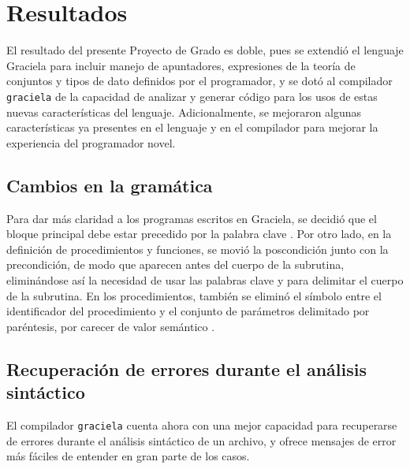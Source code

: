 \chapter{Resultados}
\label{capitulo4}

El resultado del presente Proyecto de Grado es doble, pues se extendió el
lenguaje Graciela para incluir manejo de apuntadores, expresiones de la teoría
de conjuntos y tipos de dato definidos por el programador, y se dotó al
compilador \texttt{graciela} de la capacidad de analizar y generar código para
los usos de estas nuevas características del lenguaje. Adicionalmente, se
mejoraron algunas características ya presentes en el lenguaje y en el compilador
para mejorar la experiencia del programador novel.


\section{Cambios en la gramática}

Para dar más claridad a los programas escritos en Graciela, se decidió que el
bloque principal debe estar precedido por la palabra clave .  Por
otro lado, en la definición de procedimientos y funciones, se movió la
poscondición junto con la precondición, de modo que aparecen antes del cuerpo de
la subrutina, eliminándose así la necesidad de usar las palabras clave
 y  para delimitar el cuerpo de la subrutina. En los
procedimientos, también se eliminó el  símbolo \ingra{:} entre el identificador
del procedimiento y el conjunto de parámetros delimitado por paréntesis, por
carecer de valor semántico .

\section{Recuperación de errores durante el análisis sintáctico}

El compilador \texttt{graciela} cuenta ahora con una mejor capacidad para
recuperarse de errores durante el análisis sintáctico de un archivo, y ofrece
mensajes de error más fáciles de entender en gran parte de los casos.

